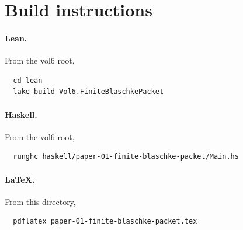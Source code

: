 \documentclass[11pt]{article}
\theoremstyle{plain}
\theoremstyle{definition}
\theoremstyle{remark}
\begin{document}
\section{Build instructions}\label{app:build}

\paragraph{Lean.}  From the vol6 root,
\begin{verbatim}
  cd lean
  lake build Vol6.FiniteBlaschkePacket
\end{verbatim}

\paragraph{Haskell.}  From the vol6 root,
\begin{verbatim}
  runghc haskell/paper-01-finite-blaschke-packet/Main.hs
\end{verbatim}

\paragraph{LaTeX.}  From this directory,
\begin{verbatim}
  pdflatex paper-01-finite-blaschke-packet.tex
\end{verbatim}
\end{document}
